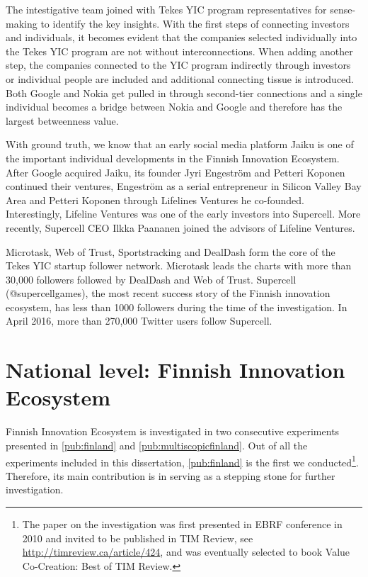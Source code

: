 The intestigative team joined with Tekes YIC program representatives for sense-making to identify the key insights. With the first steps of connecting investors and individuals, it becomes evident that the companies selected individually into the Tekes YIC program are not without interconnections. When adding another step, the companies connected to the YIC program indirectly through investors or individual people are included and additional connecting tissue is introduced. Both Google and Nokia get pulled in through second-tier connections and a single individual becomes a bridge between Nokia and Google and therefore has the largest betweenness value.

With ground truth, we know that an early social media platform Jaiku is one of the important individual developments in the Finnish Innovation Ecosystem. After Google acquired Jaiku, its founder Jyri Engeström and Petteri Koponen continued their ventures, Engeström as a serial entrepreneur in Silicon Valley Bay Area and Petteri Koponen through  Lifelines Ventures he co-founded. Interestingly, Lifeline Ventures was one of the early investors into Supercell. More recently, Supercell CEO Ilkka Paananen joined the advisors of Lifeline Ventures.

Microtask, Web of Trust, Sportstracking and DealDash form the core of the Tekes YIC startup follower network. Microtask leads the charts with more than 30,000 followers followed by DealDash and Web of Trust. Supercell (@supercellgames), the most recent success story of the Finnish innovation ecosystem, has less than 1000 followers during the time of the investigation. In April 2016, more than 270,000 Twitter users follow Supercell.

\section{National level: Finnish Innovation Ecosystem}

Finnish Innovation Ecosystem is investigated in two consecutive experiments presented in \ref{pub:finland} and \ref{pub:multiscopicfinland}. Out of all the experiments included in this dissertation, \ref{pub:finland} is the first we \citep{Huhtamaki2013AFinancing} conducted\footnote{The paper on the investigation was first presented in EBRF conference in 2010 and invited to be published in TIM Review, see \url{http://timreview.ca/article/424}, and was eventually selected to book Value Co-Creation: Best of TIM Review.}. Therefore, its main contribution is in serving as a stepping stone for further investigation. 

